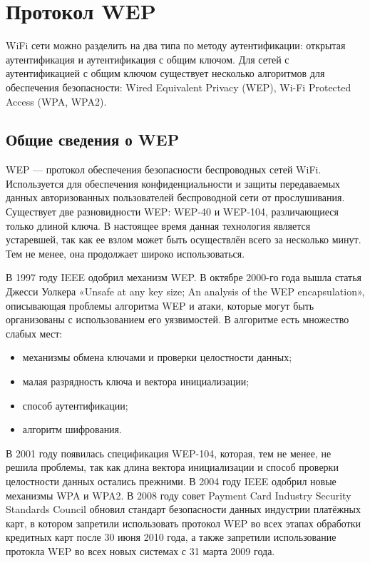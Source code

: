 \chapter{Протокол WEP}

WiFi сети можно разделить на два типа по методу аутентификации: открытая
аутентификация и аутентификация с общим ключом. Для сетей с аутентификацией с
общим ключом существует несколько алгоритмов для обеспечения безопасности: Wired
Equivalent Privacy (WEP), Wi-Fi Protected Access (WPA, WPA2).

\section{Общие сведения о WEP}

WEP --- протокол обеспечения безопасности беспроводных сетей WiFi. Используется
для обеспечения конфиденциальности и защиты передаваемых данных авторизованных
пользователей беспроводной сети от прослушивания.  Существует две разновидности
WEP: WEP-40 и WEP-104, различающиеся только длиной ключа. В настоящее время
данная технология является устаревшей, так как ее взлом может быть осуществлён
всего за несколько минут. Тем не менее, она продолжает широко использоваться.

В 1997 году IEEE одобрил механизм WEP. В октябре 2000-го года вышла статья
Джесси Уолкера «Unsafe at any key size; An analysis of the WEP encapsulation»,
описывающая проблемы алгоритма WEP и атаки, которые могут быть организованы с
использованием его уязвимостей.  В алгоритме есть множество слабых мест:

\begin{itemize}
    \item механизмы обмена ключами и проверки целостности данных;
    \item малая разрядность ключа и вектора инициализации;
    \item способ аутентификации;
    \item алгоритм шифрования.
\end{itemize}

В 2001 году появилась спецификация WEP-104, которая, тем не менее, не решила
проблемы, так как длина вектора инициализации и способ проверки целостности
данных остались прежними. В 2004 году IEEE одобрил новые механизмы WPA и WPA2. В
2008 году совет Payment Card Industry Security Standards Council обновил
стандарт безопасности данных индустрии платёжных карт, в котором запретили
использовать протокол WEP во всех этапах обработки кредитных карт после 30 июня
2010 года, а также запретили использование протокла WEP во всех новых системах с
31 марта 2009 года.

